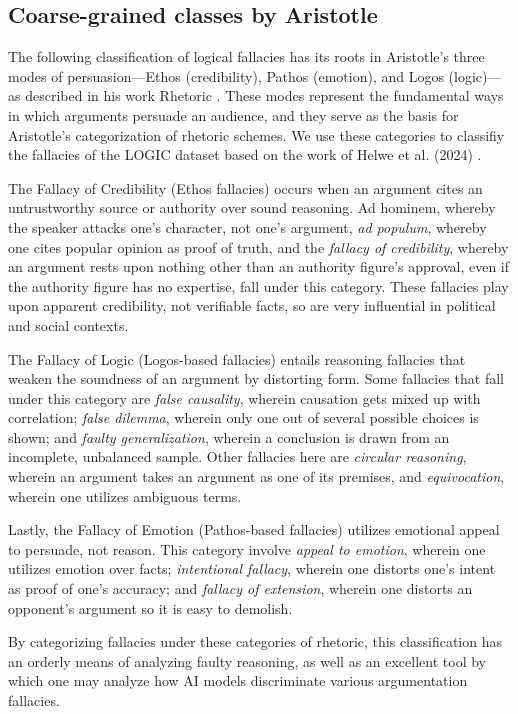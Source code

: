 \subsection{Coarse-grained classes by Aristotle}

The following classification of logical fallacies has its roots in Aristotle's \cite{wisse1989ethos} three modes of persuasion—Ethos (credibility), Pathos (emotion), and Logos (logic)—as described in his work Rhetoric \cite{rapp2002aristotle}. These modes represent the fundamental ways in which arguments persuade an audience, and they serve as the basis for Aristotle’s categorization of rhetoric schemes. We use these categories to classifiy the fallacies of the LOGIC dataset based on the work of Helwe et al. (2024) \cite{helwe2023mafalda}.
\par
The Fallacy of Credibility (Ethos fallacies) occurs when an argument cites an untrustworthy source or authority over sound reasoning. Ad hominem, whereby the speaker attacks one’s character, not one’s argument, \textit{ad populum}, whereby one cites popular opinion as proof of truth, and the \textit{fallacy of credibility}, whereby an argument rests upon nothing other than an authority figure’s approval, even if the authority figure has no expertise, fall under this category. These fallacies play upon apparent credibility, not verifiable facts, so are very influential in political and social contexts.
\par
The Fallacy of Logic (Logos-based fallacies) entails reasoning fallacies that weaken the soundness of an argument by distorting form. Some fallacies that fall under this category are \textit{false causality}, wherein causation gets mixed up with correlation; \textit{false dilemma}, wherein only one out of several possible choices is shown; and \textit{faulty generalization}, wherein a conclusion is drawn from an incomplete, unbalanced sample. Other fallacies here are \textit{circular reasoning}, wherein an argument takes an argument as one of its premises, and \textit{equivocation}, wherein one utilizes ambiguous terms.
\par
Lastly, the Fallacy of Emotion (Pathos-based fallacies) utilizes emotional appeal to persuade, not reason. This category involve \textit{appeal to emotion}, wherein one utilizes emotion over facts; \textit{intentional fallacy}, wherein one distorts one’s intent as proof of one’s accuracy; and \textit{fallacy of extension}, wherein one distorts an opponent’s argument so it is easy to demolish.
\par
By categorizing fallacies under these categories of rhetoric, this classification has an orderly means of analyzing faulty reasoning, as well as an excellent tool by which one may analyze how AI models discriminate various argumentation fallacies.

